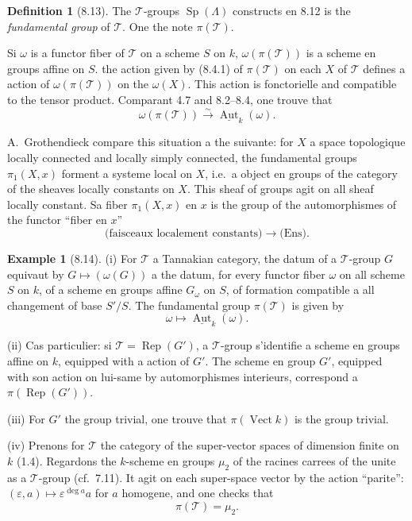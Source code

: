 \documentclass[12pt,a4paper]{article}
\theoremstyle{plain}
\theoremstyle{definition}
\newtheorem{definition}[theorem]{Definition}
\newtheorem{example}[theorem]{Example}
\DeclareMathOperator{\Sp}{Sp}
\DeclareMathOperator{\Aut}{Aut}
\DeclareMathOperator{\Rep}{Rep}
\DeclareMathOperator{\Vect}{Vect}
\begin{document}
\begin{definition}[8.13]
The $\mathcal{T}$-groups $\Sp(\Lambda)$ constructs en 8.12 is the \emph{fundamental group} of $\mathcal{T}$. One the note $\pi(\mathcal{T})$.
\end{definition}

Si $\omega$ is a functor fiber of $\mathcal{T}$ on a scheme $S$ on $k$, $\omega(\pi(\mathcal{T}))$ is a scheme en groups affine on $S$. the action given by (8.4.1) of $\pi(\mathcal{T})$ on each $X$ of $\mathcal{T}$ defines a action of $\omega(\pi(\mathcal{T}))$ on the $\omega(X)$. This action is fonctorielle and compatible to the tensor product. Comparant 4.7 and 8.2--8.4, one trouve that
\begin{equation}\label{eq:8.13.1}
\omega(\pi(\mathcal{T})) \xrightarrow{\sim} \underline{\Aut}_k(\omega).
\end{equation}

A.~Grothendieck compare this situation a the suivante: for $X$ a space topologique locally connected and locally simply connected, the fundamental groups $\pi_1(X, x)$ forment a systeme local on $X$, i.e.~a object en groups of the category of the sheaves locally constants on $X$. This sheaf of groups agit on all sheaf locally constant. Sa fiber $\pi_1(X, x)$ en $x$ is the group of the automorphismes of the functor ``fiber en $x$''
\[
\text{(faisceaux localement constants)} \to \text{(Ens)}.
\]

\begin{example}[8.14]
\textup{(i)} For $\mathcal{T}$ a Tannakian category, the datum of a $\mathcal{T}$-group $G$ equivaut by $G \mapsto (\omega(G))$ a the datum, for every functor fiber $\omega$ on all scheme $S$ on $k$, of a scheme en groups affine $G_\omega$ on $S$, of formation compatible a all changement of base $S'/S$. The fundamental group $\pi(\mathcal{T})$ is given by
\[
\omega \mapsto \underline{\Aut}_k(\omega).
\]

\textup{(ii)} Cas particulier: si $\mathcal{T} = \Rep(G')$, a $\mathcal{T}$-group s'identifie a scheme en groups affine on $k$, equipped with a action of $G'$. The scheme en group $G'$, equipped with son action on lui-same by automorphismes interieurs, correspond a $\pi(\Rep(G'))$.

\textup{(iii)} For $G'$ the group trivial, one trouve that $\pi(\Vect k)$ is the group trivial.

\textup{(iv)} Prenons for $\mathcal{T}$ the category of the super-vector spaces of dimension finite on $k$ (1.4). Regardons the $k$-scheme en groups $\mu_2$ of the racines carrees of the unite as a $\mathcal{T}$-group (cf.~7.11). It agit on each super-space vector by the action ``parite'': $(\varepsilon, a) \mapsto \varepsilon^{\deg a} a$ for $a$ homogene, and one checks that
\[
\pi(\mathcal{T}) = \mu_2.
\]
\end{example}
\end{document}
